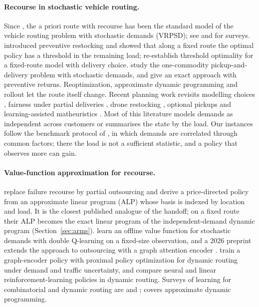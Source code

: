 \documentclass[trsc,dblanonrev]{informs4}
\begin{document}
\paragraph{Recourse in stochastic vehicle routing.} Since
\citet{bertsimas1992vehicle}, the a priori route with recourse has been the
standard model of the vehicle routing problem with stochastic demands (VRPSD);
see \citet{gendreau1996stochastic} and \citet{oyola2018stochastic} for surveys.
\citet{yang2000stochastic} introduced preventive restocking and showed that
along a fixed route the optimal policy has a threshold in the remaining load;
\citet{venkateshan2026note} re-establish threshold optimality for a fixed-route
model with delivery choice. \citet{louveaux2009one} study the one-commodity
pickup-and-delivery problem with stochastic demands, and
\citet{louveaux2018exact} give an exact approach with preventive returns.
Reoptimization, approximate dynamic programming and rollout
\citep{secomandi2009reoptimization, novoa2009approximate,
goodson2016restocking} let the route itself change. Recent planning work
revisits modelling choices \citep{hoogendoorn2025evaluation}, fairness under
partial deliveries \citep{kinable2026fair}, drone restocking
\citep{wang2025truckdrone}, optional pickups \citep{gobbi2026optional} and
learning-assisted matheuristics \citep{reynal2026hybrid}. Most of this
literature models demands as independent across customers or summarises the
state by the load. Our instances follow the benchmark protocol of
\citet{dang2026baton}, in which demands are correlated through common factors;
there the load is not a sufficient statistic, and a policy that observes more
can gain.

\paragraph{Value-function approximation for recourse.}
\citet{zhu2026partial} replace failure recourse by partial outsourcing and
derive a price-directed policy from an approximate linear program (ALP) whose
basis is indexed by location and load. It is the closest published analogue of
the handoff; on a fixed route their ALP becomes the exact linear program of the
independent-demand dynamic program (Section~\ref{sec:arms}).
\citet{dastpak2023offline} learn an offline value function for stochastic
demands with double Q-learning on a fixed-size observation, and a 2026
preprint extends the approach to outsourcing with a graph attention encoder
\citep{dastpak2026deep}. \citet{kadyrov2025drl} train a graph-encoder policy
with proximal policy optimization for dynamic routing under demand and traffic
uncertainty, and \citet{akkerman2025comparison} compare neural and linear
reinforcement-learning policies in dynamic routing. Surveys of learning for
combinatorial and dynamic routing are \citet{bengio2021machine} and
\citet{soeffker2022stochastic}; \citet{powell2011approximate} covers
approximate dynamic programming.
\end{document}
